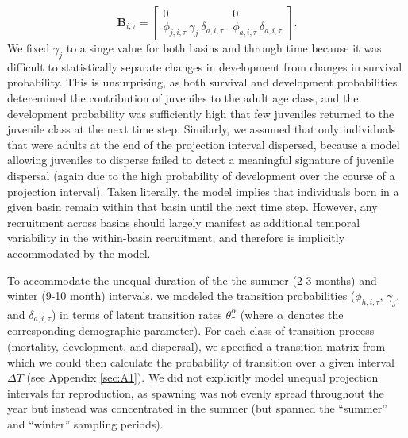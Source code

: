 %
\begin{equation} \label{eq:B}
\mathbf{B}_{i,\tau} = 
\left[
\begin{array}{cccc}
    0 & 
    0 \\
    
    \phi_{j,i,\tau}~\gamma_{j}~\delta_{a,i,\tau} & 
    \phi_{a,i,\tau}~\delta_{a,i,\tau}
    \end{array}
\right].
\end{equation}
%
We fixed $\gamma_{j}$ to a singe value for both basins and through time because 
it was difficult to statistically separate changes in development from changes 
in survival probability.
This is unsurprising, as both survival and development probabilities
deteremined the contribution of juveniles to the adult age class,
and the development probability was sufficiently 
high that few juveniles returned to the juvenile class at the next time step. 
Similarly, we assumed that only individuals that were adults at the end of the projection
interval dispersed, because a model allowing juveniles to disperse failed to detect 
a meaningful signature of juvenile dispersal 
(again due to the high probability of development over the course of a projection interval).
Taken literally, the model implies that individuals born in a given basin
remain within that basin until the next time step.
However, any recruitment across basins should largely manifest 
as additional temporal variability in the within-basin recruitment,
and therefore is implicitly accommodated by the model.

To accommodate the unequal duration of the the summer (2-3 months) and winter (9-10 month)
intervals, we modeled the transition probabilities 
($\phi_{h,i,\tau}$, $\gamma_{j}$, and $\delta_{a,i,\tau}$)
in terms of latent transition rates $\theta^{\alpha}_{\tau}$ 
(where $\alpha$ denotes the corresponding demographic parameter).
For each class of transition process (mortality, development, and dispersal),
we specified a transition matrix from which we could then calculate
the probability of transition over a given interval $\Delta T$ 
(see Appendix \ref{sec:A1}).
We did not explicitly model unequal projection intervals for reproduction,
as spawning was not evenly spread throughout the year but instead was concentrated
in the summer (but spanned the ``summer'' and ``winter'' sampling periods).

